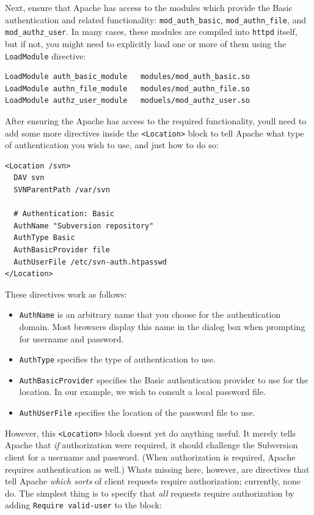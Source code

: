 Next, ensure that Apache has access to the modules which provide the
Basic authentication and related functionality:
\texttt{mod\_auth\_basic}, \texttt{mod\_authn\_file}, and
\texttt{mod\_authz\_user}. In many cases, these modules are compiled
into \texttt{httpd} itself, but if not, you might need to explicitly
load one or more of them using the \texttt{LoadModule} directive:

\begin{verbatim}
LoadModule auth_basic_module   modules/mod_auth_basic.so
LoadModule authn_file_module   modules/mod_authn_file.so
LoadModule authz_user_module   moduels/mod_authz_user.so
\end{verbatim}

After ensuring the Apache has access to the required functionality,
you\textquotesingle ll need to add some more directives inside the
\texttt{\textless{}Location\textgreater{}} block to tell Apache what
type of authentication you wish to use, and just how to do so:

\begin{verbatim}
<Location /svn>
  DAV svn
  SVNParentPath /var/svn

  # Authentication: Basic
  AuthName "Subversion repository"
  AuthType Basic
  AuthBasicProvider file
  AuthUserFile /etc/svn-auth.htpasswd
</Location>
\end{verbatim}

These directives work as follows:

\begin{itemize}
\item
  \texttt{AuthName} is an arbitrary name that you choose for the
  authentication domain. Most browsers display this name in the dialog
  box when prompting for username and password.
\item
  \texttt{AuthType} specifies the type of authentication to use.
\item
  \texttt{AuthBasicProvider} specifies the Basic authentication provider
  to use for the location. In our example, we wish to consult a local
  password file.
\item
  \texttt{AuthUserFile} specifies the location of the password file to
  use.
\end{itemize}

However, this \texttt{\textless{}Location\textgreater{}} block
doesn\textquotesingle t yet do anything useful. It merely tells Apache
that \emph{if} authorization were required, it should challenge the
Subversion client for a username and password. (When authorization is
required, Apache requires authentication as well.)
What\textquotesingle s missing here, however, are directives that tell
Apache \emph{which sorts} of client requests require authorization;
currently, none do. The simplest thing is to specify that \emph{all}
requests require authorization by adding \texttt{Require\ valid-user} to
the block:

